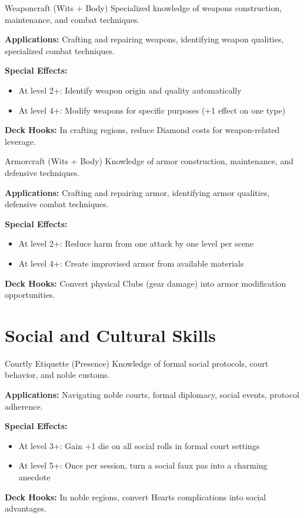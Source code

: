 \documentclass[11pt]{report}
\begin{document}
\begin{skillbox}{Weaponcraft (Wits + Body)}
Specialized knowledge of weapons construction, maintenance, and combat techniques.

\textbf{Applications:} Crafting and repairing weapons, identifying weapon qualities, specialized combat techniques.

\textbf{Special Effects:}
\begin{itemize}
    \item At level 2+: Identify weapon origin and quality automatically
    \item At level 4+: Modify weapons for specific purposes (+1 effect on one type)
\end{itemize}

\textbf{Deck Hooks:} In crafting regions, reduce Diamond costs for weapon-related leverage.
\end{skillbox}

\begin{skillbox}{Armorcraft (Wits + Body)}
Knowledge of armor construction, maintenance, and defensive techniques.

\textbf{Applications:} Crafting and repairing armor, identifying armor qualities, defensive combat techniques.

\textbf{Special Effects:}
\begin{itemize}
    \item At level 2+: Reduce harm from one attack by one level per scene
    \item At level 4+: Create improvised armor from available materials
\end{itemize}

\textbf{Deck Hooks:} Convert physical Clubs (gear damage) into armor modification opportunities.
\end{skillbox}

\section{Social and Cultural Skills}

\begin{skillbox}{Courtly Etiquette (Presence)}
Knowledge of formal social protocols, court behavior, and noble customs.

\textbf{Applications:} Navigating noble courts, formal diplomacy, social events, protocol adherence.

\textbf{Special Effects:}
\begin{itemize}
    \item At level 3+: Gain +1 die on all social rolls in formal court settings
    \item At level 5+: Once per session, turn a social faux pas into a charming anecdote
\end{itemize}

\textbf{Deck Hooks:} In noble regions, convert Hearts complications into social advantages.
\end{skillbox}
\end{document}
